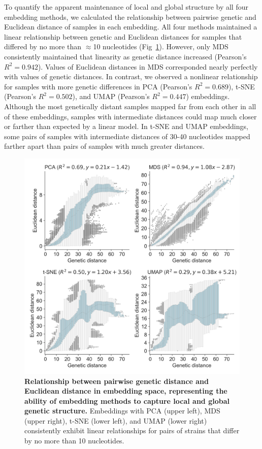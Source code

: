\documentclass[10pt,letterpaper]{article}
\begin{document}
To quantify the apparent maintenance of local and global structure by all four embedding methods, we calculated the relationship between pairwise genetic and Euclidean distance of samples in each embedding.
All four methods maintained a linear relationship between genetic and Euclidean distances for samples that differed by no more than $\approx$10 nucleotides (Fig~\ref{fig:seasonal-influenza-h3n2-ha-pairwise-distances}).
However, only MDS consistently maintained that linearity as genetic distance increased (Pearson's $R^{2} = 0.942$).
Values of Euclidean distances in MDS corresponded nearly perfectly with values of genetic distances.
In contrast, we observed a nonlinear relationship for samples with more genetic differences in PCA (Pearson's $R^{2} = 0.689$), t-SNE (Pearson's $R^{2} = 0.502$), and UMAP (Pearson's $R^{2} = 0.447$) embeddings.
Although the most genetically distant samples mapped far from each other in all of these embeddings, samples with intermediate distances could map much closer or farther than expected by a linear model.
In t-SNE and UMAP embeddings, some pairs of samples with intermediate distances of 30-40 nucleotides mapped farther apart than pairs of samples with much greater distances.

\begin{figure}[!h]
\includegraphics[width=\columnwidth]{figures/flu-2016-2018-ha-euclidean-distance-by-genetic-distance.png}
\caption{{\bf Relationship between pairwise genetic distance and Euclidean distance in embedding space, representing the ability of embedding methods to capture local and global genetic structure.}
Embeddings with PCA (upper left), MDS (upper right), t-SNE (lower left), and UMAP (lower right) consistently exhibit linear relationships for pairs of strains that differ by no more than 10 nucleotides.}
\label{fig:seasonal-influenza-h3n2-ha-pairwise-distances}
\end{figure}
\end{document}
